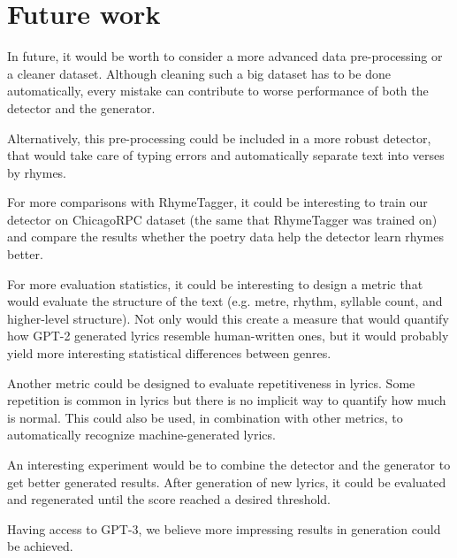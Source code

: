 \section*{Future work}
In future, it would be worth to consider a more advanced data pre-processing or a cleaner dataset. Although cleaning such a big dataset has to be done automatically, every mistake can contribute to worse performance of both the detector and the generator. 

Alternatively, this pre-processing could be included in a more robust detector, that would take care of typing errors and automatically separate text into verses by rhymes.

For more comparisons with RhymeTagger, it could be interesting to train our detector on ChicagoRPC dataset (the same that RhymeTagger was trained on) and compare the results whether the poetry data help the detector learn rhymes better.

For more evaluation statistics, it could be interesting to design a metric that would evaluate the structure of the text (e.g. metre, rhythm, syllable count, and higher-level structure). Not only would this create a measure that would quantify how GPT-2 generated lyrics resemble human-written ones, but it would probably yield more interesting statistical differences between genres.

Another metric could be designed to evaluate repetitiveness in lyrics. Some repetition is common in lyrics but there is no implicit way to quantify how much is normal. This could also be used, in combination with other metrics, to automatically recognize machine-generated lyrics.

An interesting experiment would be to combine the detector and the generator to get better generated results. After generation of new lyrics, it could be evaluated and regenerated until the score reached a desired threshold.

Having access to GPT-3, we believe more impressing results in generation could be achieved.
